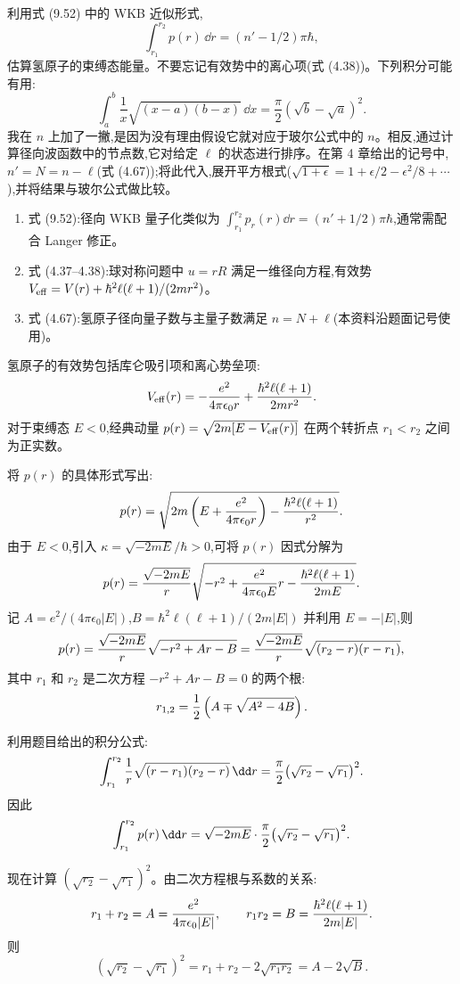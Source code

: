 \begin{question}
利用式 (9.52) 中的 WKB 近似形式,
\[
\int_{r_1}^{r_2}p(r)\,\dd r=(n'-1/2)\pi\hbar,
\]
估算氢原子的束缚态能量。不要忘记有效势中的离心项(式 (4.38))。下列积分可能有用:
\[
\int_a^b\frac{1}{x}\sqrt{(x-a)(b-x)}\,\dd x=\frac{\pi}{2}(\sqrt b-\sqrt a)^2.
\]
我在 $n$ 上加了一撇,是因为没有理由假设它就对应于玻尔公式中的 $n$。相反,通过计算径向波函数中的节点数,它对给定 $\ell$ 的状态进行排序。在第 4 章给出的记号中,$n'=N=n-\ell$(式 (4.67));将此代入,展开平方根式($\sqrt{1+\epsilon}=1+\epsilon/2-\epsilon^2/8+\cdots$),并将结果与玻尔公式做比较。

\par\smallskip
{}
\begin{enumerate}[leftmargin=2.2em,itemsep=0.12em,topsep=0.12em,parsep=0pt]
\item 式 (9.52):径向 WKB 量子化类似为 $\int_{r_1}^{r_2}p_r(r)\dd r=(n'+1/2)\pi\hbar$,通常需配合 Langer 修正。
\item 式 (4.37--4.38):球对称问题中 $u=rR$ 满足一维径向方程,有效势 $V_{\rm eff}=V(r)+\hbar^2\ell(\ell+1)/(2mr^2)$。
\item 式 (4.67):氢原子径向量子数与主量子数满足 $n=N+\ell$(本资料沿题面记号使用)。
\end{enumerate}

\begin{solution}
氢原子的有效势包括库仑吸引项和离心势垒项:
\[
V_{\rm eff}(r)=-{e^2\over4\pi\epsilon_0 r}+{\hbar^2\ell(\ell+1)\over2mr^2}.
\]
对于束缚态 $E<0$,经典动量 $p(r)=\sqrt{2m[E-V_{\rm eff}(r)]}$ 在两个转折点 $r_1<r_2$ 之间为正实数。

将 $p(r)$ 的具体形式写出:
\[
p(r)=\sqrt{2m\left(E+{e^2\over4\pi\epsilon_0 r}\right)-{\hbar^2\ell(\ell+1)\over r^2}}.
\]
由于 $E<0$,引入 $\kappa=\sqrt{-2mE}/\hbar>0$,可将 $p(r)$ 因式分解为
\[
p(r)={\sqrt{-2mE}\over r}\sqrt{-r^2+{e^2\over4\pi\epsilon_0 E}r
-{\hbar^2\ell(\ell+1)\over2mE}}.
\]
记 $A={e^2/(4\pi\epsilon_0|E|)}$,$B={\hbar^2\ell(\ell+1)/(2m|E|)}$ 并利用 $E=-|E|$,则
\[
p(r)={\sqrt{-2mE}\over r}\sqrt{-r^2+Ar-B}
={\sqrt{-2mE}\over r}\sqrt{(r_2-r)(r-r_1)},
\]
其中 $r_1$ 和 $r_2$ 是二次方程 $-r^2+Ar-B=0$ 的两个根:
\[
r_{1,2}={1\over2}\left(A\mp\sqrt{A^2-4B}\right).
\]

利用题目给出的积分公式:
\[
\int_{r_1}^{r_2}{1\over r}\sqrt{(r-r_1)(r_2-r)}\,\dd r
={\pi\over2}\bigl(\sqrt{r_2}-\sqrt{r_1}\bigr)^2.
\]
因此
\[
\int_{r_1}^{r_2}p(r)\,\dd r
=\sqrt{-2mE}\cdot{\pi\over2}\bigl(\sqrt{r_2}-\sqrt{r_1}\bigr)^2.
\]

现在计算 $(\sqrt{r_2}-\sqrt{r_1})^2$。由二次方程根与系数的关系:
\[
r_1+r_2=A={e^2\over4\pi\epsilon_0|E|},\qquad
r_1r_2=B={\hbar^2\ell(\ell+1)\over2m|E|}.
\]
则
\[
(\sqrt{r_2}-\sqrt{r_1})^2=r_1+r_2-2\sqrt{r_1r_2}
=A-2\sqrt{B}.
\]


\end{solution}
\end{question}
